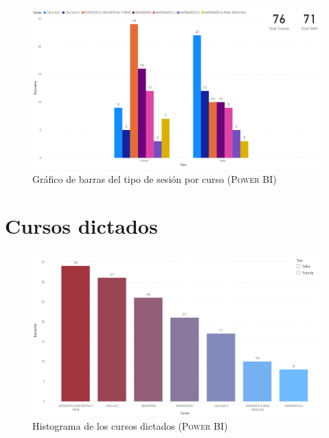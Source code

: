 \documentclass[11pt,a4paper]{book}
\theoremstyle{definition}%
\begin{document}
                \begin{figure}[H]
                    \centering
                    \includegraphics[width=1\textwidth]{Sources/histograma_TipoCurso.png}
                    \caption{Gráfico de barras del tipo de sesión por curso (\textsc{Power BI})}
                    \label{fig:histograma_TipoCurso}
                \end{figure}
                
            \section{Cursos dictados}
                
                \begin{figure}[H]
                    \centering
                    \includegraphics[width=1\textwidth]{Sources/histograma_CursosGlobal.png}
                    \caption{Histograma de los cursos dictados (\textsc{Power BI})}
                    \label{fig:histograma_CursosGlobal}
                \end{figure}
                
\end{document}
